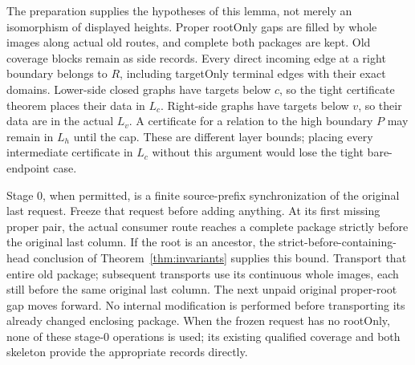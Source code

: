 The preparation supplies the hypotheses of this lemma, not merely an
isomorphism of displayed heights. Proper rootOnly gaps are filled by
whole images along actual old routes, and complete both packages are
kept. Old coverage blocks remain as side records. Every direct incoming
edge at a right boundary belongs to $R$, including targetOnly terminal
edges with their exact domains. Lower-side closed graphs have targets
below $c$, so the tight certificate theorem places their data in $L_c$.
Right-side graphs have targets below $v$, so their data are in the
actual $L_v$. A certificate for a relation to the high boundary $P$
may remain in $L_h$ until the cap. These are different layer bounds;
placing every intermediate certificate in $L_c$ without this argument
would lose the tight bare-endpoint case.

Stage 0, when permitted, is a finite source-prefix synchronization of
the original last request. Freeze that request before adding anything.
At its first missing proper pair, the actual consumer route reaches
a complete package strictly before the original last column. If the
root is an ancestor, the strict-before-containing-head conclusion of
Theorem~\ref{thm:invariants} supplies this bound. Transport that entire
old package; subsequent transports use its continuous whole images,
each still before the same original last column. The next unpaid
original proper-root gap moves forward. No internal modification is
performed before transporting its already changed enclosing package.
When the frozen request has no rootOnly, none of these stage-0
operations is used; its existing qualified coverage and both skeleton
provide the appropriate records directly.
